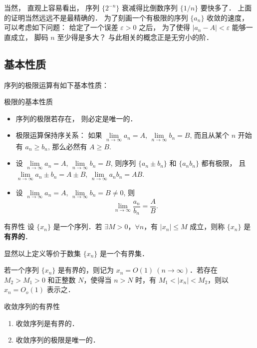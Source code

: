 当然， 直观上容易看出， 序列 $\{2^{-n}\}$ 衰减得比倒数序列 $\{1/n\}$ 要快多了． 上面的证明当然远远不是最精确的． 为了刻画一个有极限的序列 $\{a_n\}$ 收敛的速度， 可以考虑如下问题： 给定了一个误差 $\varepsilon>0$ 之后， 为了使得 $|a_n-A|<\varepsilon$ 能够一直成立， 脚码 $n$ 至少得是多大？ 与此相关的概念正是无穷小的阶． 

\subsection{基本性质}
序列的极限运算有如下基本性质：

\begin{theorem}{极限的基本性质}
\begin{itemize}
\item 序列的极限若存在， 则必定是唯一的．
\item 极限运算保持序关系： 如果 $\lim\limits_{n\to\infty}a_n=A$, $\lim\limits_{n\to\infty}b_n=B$, 而且从某个 $n$ 开始有 $a_n\geq b_n$, 那么必然有 $A\geq B$.
\item 设 $\lim\limits_{n\to\infty}a_n=A$, $\lim\limits_{n\to\infty}b_n=B$, 则序列 $\{a_n\pm b_n\}$ 和 $\{a_n b_n\}$ 都有极限， 且 $\lim\limits_{n\to\infty}a_n\pm b_n=A\pm B$, $\lim\limits_{n\to\infty}a_nb_n=AB$.
\item 设 $\lim\limits_{n\to\infty}a_n=A$, $\lim\limits_{n\to\infty}b_n=B\neq0$, 则
$$
\lim\limits_{n\to\infty}\frac{a_n}{b_n}=\frac{A}{B}.
$$
\end{itemize}
\end{theorem}


\begin{definition}{有界性}
设 $\{x_n\}$ 是一个序列．若 $\exists M>0$，$\forall n$，有 $|x_n|\leq M$ 成立，则称 $\{x_n\}$ 是\textbf{有界的}．

显然以上定义等价于数集 $\{x_n\}$ 是一个有界集．

若一个序列 $\{x_n\}$ 是有界的，则记为 $x_n=O(1)\ (n\rightarrow \infty)$．若存在 $M_2>M_1>0$ 和正整数 $N$，使得当 $n>N$ 时，有 $M_1<|x_n|<M_2$，则以 $x_n=O_o(1)$ 表示之．
\end{definition}
  
\begin{theorem}{收敛序列的有界性}
\begin{enumerate}
\item 收敛序列是有界的．
\item 收敛序列的极限是唯一的．
\end{enumerate}
\end{theorem}

